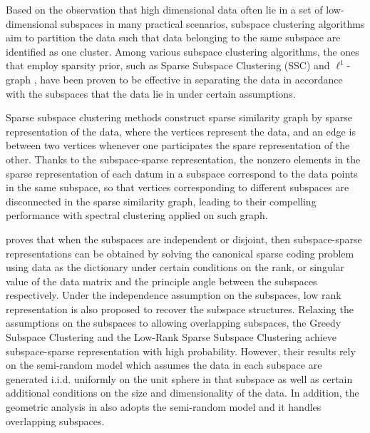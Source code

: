 \documentclass[10pt,twocolumn,letterpaper]{article}
\begin{document}

Based on the observation that high dimensional data often lie in a set of low-dimensional subspaces in many practical scenarios, subspace clustering algorithms \cite{Vidal11} aim to partition the data such that data belonging to the same subspace are identified as one cluster. Among various subspace clustering algorithms, the ones that employ sparsity prior, such as Sparse Subspace Clustering (SSC) \cite{ElhamifarV13} and $\ell^{1}$-graph \cite{YanW09,ChengYYFH10}, have been proven to be effective in separating the data in accordance with the subspaces that the data lie in under certain assumptions.

Sparse subspace clustering methods construct sparse similarity graph by sparse representation of the data, where the vertices represent the data, and an edge is between two vertices whenever one participates the spare representation of the other. Thanks to the subspace-sparse representation, the nonzero elements in the sparse representation of each datum in a subspace correspond to the data points in the same subspace, so that vertices corresponding to different subspaces are disconnected in the sparse similarity graph, leading to their compelling performance with spectral clustering \cite{Ng01} applied on such graph.

\cite{ElhamifarV13} proves that when the subspaces are independent or disjoint, then subspace-sparse representations can be obtained by solving the canonical sparse coding problem using data as the dictionary under certain conditions on the rank, or singular value of the data matrix and the principle angle between the subspaces respectively. Under the independence assumption on the subspaces, low rank representation \cite{LiuLY10,Liu12} is also proposed to recover the subspace structures. Relaxing the assumptions on the subspaces to allowing overlapping subspaces, the Greedy Subspace Clustering \cite{ParkCS14} and the Low-Rank Sparse Subspace Clustering \cite{Wang13} achieve subspace-sparse representation with high probability. However, their results rely on the semi-random model which assumes the data in each subspace are generated i.i.d. uniformly on the unit sphere in that subspace as well as certain additional conditions on the size and dimensionality of the data. In addition, the geometric analysis in \cite{Soltanolkotabi2012} also adopts the semi-random model and it handles overlapping subspaces.
\end{document}
